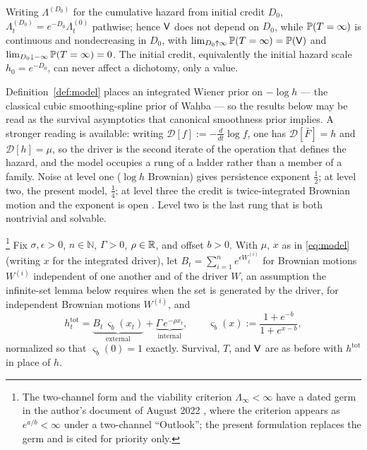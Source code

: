 \begin{lemma}\label{lem:gauge}
Writing $\Lambda^{(D_0)}$ for the cumulative hazard from initial
credit $D_0$, $\Lambda^{(D_0)}_t=e^{-D_0}\Lambda^{(0)}_t$ pathwise;
hence $\mathsf{V}$ does not depend on $D_0$, while $\mathbb{P}(T=\infty)$ is
continuous and nondecreasing in $D_0$, with
$\lim_{D_0\uparrow\infty}\mathbb{P}(T=\infty)=\mathbb{P}(\mathsf{V})$ and
$\lim_{D_0\downarrow-\infty}\mathbb{P}(T=\infty)=0$. The initial credit,
equivalently the initial hazard scale $h_0=e^{-D_0}$, can never affect
a dichotomy, only a value.
\end{lemma}

\begin{remark}
Definition~\ref{def:model} places an integrated Wiener prior on
$-\log h$ --- the classical cubic smoothing-spline prior of Wahba
\cite{Wah78} --- so the results below may be read as the survival
asymptotics that canonical smoothness prior implies. A stronger
reading is available: writing $\mathcal D[f]:=-\frac{d}{dt}\log f$,
one has $\mathcal D[\bar F]=h$ and $\mathcal D[h]=\mu$, so the driver
is the second iterate of the operation that defines the hazard, and
the model occupies a rung of a ladder rather than a member of a
family. Noise at level one ($\log h$ Brownian) gives persistence
exponent $\tfrac12$; at level two, the present model, $\tfrac14$; at
level three the credit is twice-integrated Brownian motion and the
exponent is open \cite{AS15,AD13}. Level two is the last rung that is
both nontrivial and solvable.
\end{remark}

\begin{definition}\label{def:twochannel}\footnote{The
two-channel form and the viability criterion $\Lambda_\infty<\infty$
have a dated germ in the author's document of August 2022
\cite{GoldenScience2022}, where the criterion appears as $e^{a/b}<\infty$
under a two-channel ``Outlook''; the present formulation replaces the
germ and is cited for priority only.}
Fix $\sigma,\epsilon>0$, $n\in\mathbb N$, $\Gamma>0$, $\rho\in\mathbb{R}$, and
offset $b>0$. With $\mu$, $x$ as in \eqref{eq:model} (writing $x$ for
the integrated driver), let
$B_t=\sum_{i=1}^n e^{\epsilon W^{(i)}_t}$ for Brownian motions
$W^{(i)}$ independent of one another and of the driver $W$, an
assumption the infinite-set lemma below requires when the set is
generated by the driver, for independent Brownian
motions $W^{(i)}$, and
\begin{equation}\label{eq:hazard}
h^{\mathrm{tot}}_t
=\underbrace{B_t\,\varsigma_b(x_t)}_{\text{external}}
+\underbrace{\Gamma\,e^{-\rho x_t}}_{\text{internal}},
\qquad
\varsigma_b(x):=\frac{1+e^{-b}}{1+e^{x-b}},
\end{equation}
normalized so that $\varsigma_b(0)=1$ exactly. Survival, $T$, and
$\mathsf{V}$ are as before with $h^{\mathrm{tot}}$ in place of $h$.
\end{definition}

